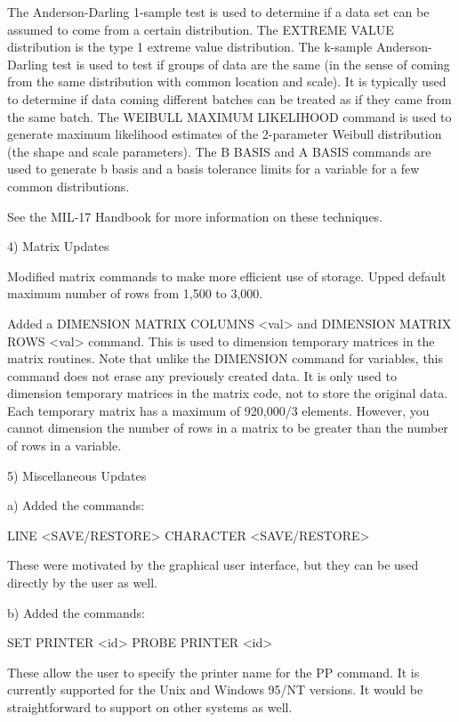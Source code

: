 {       The Anderson-Darling 1-sample test is used to determine if a
       data set can be assumed to come from a certain distribution.
       The EXTREME VALUE distribution is the type 1 extreme value
       distribution.  The k-sample Anderson-Darling test is used
       to test if groups of data are the same (in the sense of
       coming from the same distribution with common location and
       scale).  It is typically used to determine if data coming
       different batches can be treated as if they came from the
       same batch.  The WEIBULL MAXIMUM LIKELIHOOD command is used
       to generate maximum likelihood estimates of the 2-parameter
       Weibull distribution (the shape and scale parameters).
       The B BASIS and A BASIS commands are used to generate 
       b basis and a basis tolerance limits for a variable
       for a few common distributions.

       See the MIL-17 Handbook for more information on these
       techniques.

 4) Matrix Updates

    Modified matrix commands to make more efficient use of
    storage.  Upped default maximum number of rows from 1,500 to
    3,000.

    Added a DIMENSION MATRIX COLUMNS <val> and DIMENSION MATRIX ROWS
    <val> command.  This is used to dimension temporary matrices
    in the matrix routines.  Note that unlike the DIMENSION command
    for variables, this command does not erase any previously
    created data.  It is only used to dimension temporary matrices
    in the matrix code, not to store the original data.
    Each temporary matrix has a maximum of 920,000/3 elements.
    However, you cannot dimension the number of rows in a matrix
    to be greater than the number of rows in a variable.


 5) Miscellaneous Updates

    a) Added the commands:
   
          LINE <SAVE/RESTORE>
          CHARACTER <SAVE/RESTORE>
   
       These were motivated by the graphical user interface, but they
       can be used directly by the user as well.
   
    b) Added the commands:
   
          SET PRINTER <id>
          PROBE PRINTER <id>
   
       These allow the user to specify the printer name for the
       PP command.  It is currently supported for the Unix and
       Windows 95/NT versions.  It would be straightforward to support
       on other systems as well.
   
}
